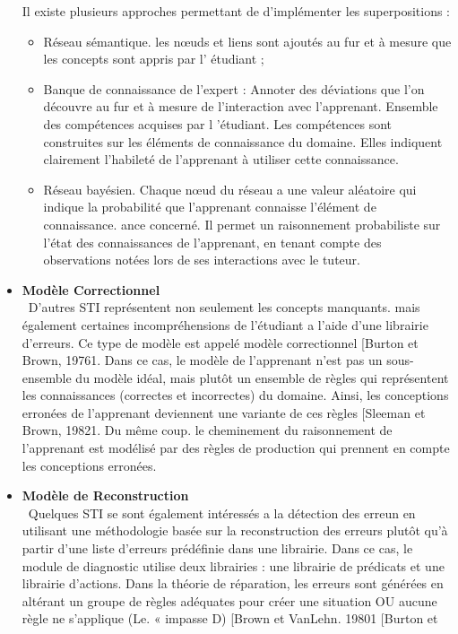 \begin{itemize}
Il existe plusieurs approches permettant de d'implémenter les superpositions :
 
\begin{itemize}
\item Réseau sémantique. les nœuds et liens sont ajoutés au fur et à mesure que les concepts sont appris par l' étudiant ; 
\item Banque de connaissance de l’expert :  Annoter des déviations que l'on découvre au fur et à mesure de l'interaction avec l'apprenant. 
Ensemble des compétences acquises par l 'étudiant.  Les compétences sont construites sur les éléments de connaissance du domaine. Elles indiquent clairement l'habileté de l'apprenant à utiliser cette connaissance. 
\item Réseau bayésien. Chaque nœud du réseau a une valeur aléatoire qui indique la probabilité que l'apprenant connaisse l'élément de connaissance. ance concerné. Il permet un raisonnement probabiliste sur l'état des connaissances de l'apprenant, en tenant compte des observations notées lors de ses interactions avec le tuteur.
\end{itemize}
\item \textbf{Modèle Correctionnel} \\\
D'autres STI représentent non seulement les concepts manquants. mais également certaines incompréhensions de l'étudiant a l'aide d'une librairie d'erreurs. Ce type de modèle est appelé modèle correctionnel [Burton et Brown, 19761. Dans ce cas, le modèle de l'apprenant n'est pas un sous-ensemble du modèle idéal, mais plutôt un ensemble de règles qui représentent les connaissances (correctes et incorrectes) du domaine. Ainsi, les conceptions erronées de l'apprenant deviennent une variante de ces règles [Sleeman et Brown, 19821. Du même coup. le cheminement du raisonnement de l'apprenant est modélisé par des règles de production qui prennent en compte les conceptions erronées.
\item \textbf{Modèle de Reconstruction} \\\
Quelques STI se sont également intéressés a la détection des erreun en utilisant une
méthodologie basée sur la reconstruction des erreurs plutôt qu'à partir d'une liste d'erreurs
prédéfinie dans une librairie. Dans ce cas, le module de diagnostic utilise deux librairies :
une librairie de prédicats et une librairie d'actions. Dans la théorie de réparation, les
erreurs sont générées en altérant un groupe de règles adéquates pour créer une situation
OU aucune règle ne s'applique (Le. « impasse D) [Brown et VanLehn. 19801 [Burton et

\end{itemize}
